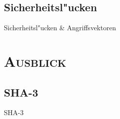 \documentclass[xcolor=x11names,compress]{beamer}
\renewcommand{\(}{\begin{columns}}
\renewcommand{\)}{\end{columns}}
\newcommand{\<}[1]{\begin{column}{#1}}
\renewcommand{\>}{\end{column}}
\begin{document}
\subsection{Sicherheitsl"ucken}
\begin{frame}{Sicherheitsl"ucken \& Angriffsvektoren}

\end{frame}

\section{\scshape Ausblick}
\subsection{SHA-3}
\begin{frame}{SHA-3}

\end{frame}
\end{document}
